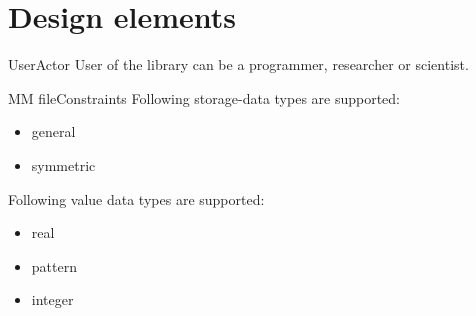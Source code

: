 	\section{Design elements} \label{s:context-viewpoint-template:design-elements}

	
		\begin{design-element}{User}{Actor}
			User of the library can be a programmer, researcher or scientist.
		\end{design-element}
	
		\begin{design-element}{\gls{MM} file}{Constraints}
			Following storage-data types are supported:
			\begin{itemize}
				\item general
				\item symmetric
			\end{itemize}
			Following value data types are supported:
			\begin{itemize}
				\item real
				\item pattern
				\item integer
			\end{itemize}
		\end{design-element}

